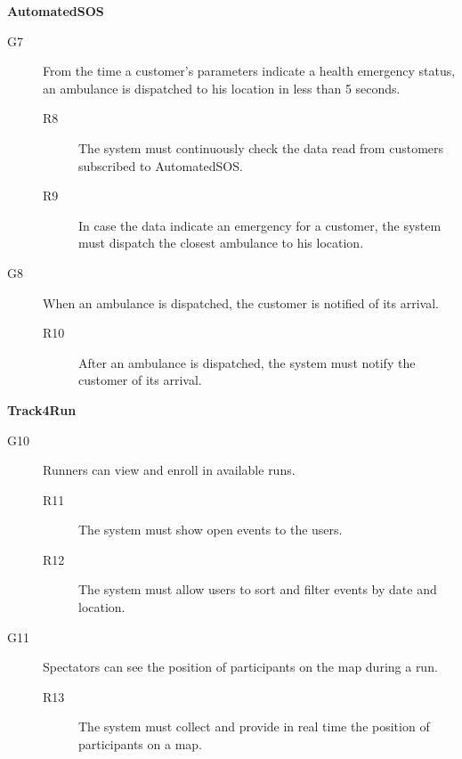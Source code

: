 \documentclass[../main.tex]{subfiles}
\begin{document}
\vspace{8mm}

{\bf AutomatedSOS}
\begin{description}
	\item [G7]  From the time a customer's parameters indicate a health emergency status, an ambulance is dispatched to his location in less than 5 seconds.
	\begin{description}
		\item [R8] The system must continuously check the data read from customers subscribed to AutomatedSOS.
		\item [R9] In case the data indicate an emergency for a customer, the system must dispatch the closest ambulance to his location.
	\end{description}

	\item [G8]  When an ambulance is dispatched, the customer is notified of its arrival.
	\begin{description}
		\item [R10] After an ambulance is dispatched, the system must notify the customer of its arrival.
	\end{description}
\end{description}

\vspace{8mm}

{\bf Track4Run}
\begin{description}

	\item [G10]  Runners can view and enroll in available runs.
	\begin{description}
		\item [R11] The system must show open events to the users.
		\item [R12] The system must allow users to sort and filter events by date and location.
	\end{description}

	\item [G11] Spectators can see the position of participants on the map during a run.
	\begin{description}
		\item [R13] The system must collect and provide in real time the position of participants on a map.
	\end{description}
\end{description}
\end{document}
